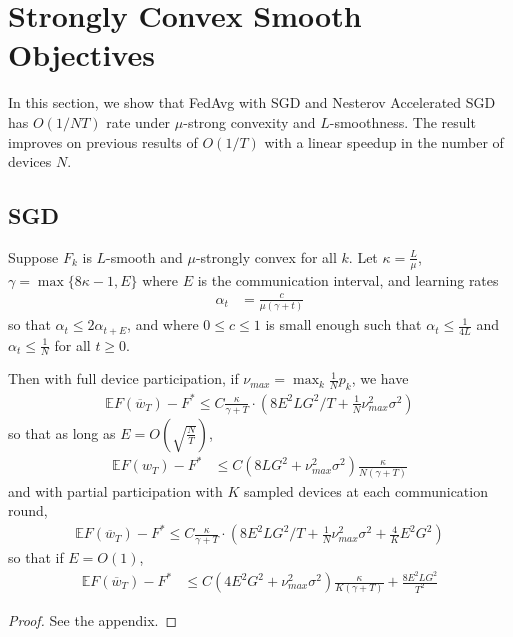 


\section{Strongly Convex Smooth Objectives}

In this section, we show that FedAvg with SGD and Nesterov Accelerated SGD has $O(1/NT)$ rate under $\mu$-strong
convexity and $L$-smoothness. The result improves on previous results of
$O(1/T)$ with a linear speedup in the number of devices $N$.

\subsection{SGD}

\begin{theorem}
	Suppose $F_{k}$ is $L$-smooth and $\mu$-strongly convex for all
	$k$. Let $\kappa=\frac{L}{\mu}$, $\gamma=\max\{8\kappa-1,E\}$ where
	$E$ is the communication interval, and learning rates 
	\begin{align*}
	\alpha_{t} & =\frac{c}{\mu(\gamma+t)}
	\end{align*}
	so that $\alpha_{t}\leq2\alpha_{t+E}$, and where $0\leq c\leq1$
	is small enough such that
	$\alpha_{t} \leq\frac{1}{4L}$ and 
	$\alpha_{t} \leq\frac{1}{N}$ for all $t\geq0$. 
	
	Then with full device participation, if $\nu_{max}=\max_{k}\frac{1}{N}p_{k}$,
	we have 
	\begin{align*}
	\mathbb{E}F(\overline{w}_{T})-F^{\ast}\leq C\frac{\kappa}{\gamma+T}\cdot(8E^{2}LG^{2}/T+\frac{1}{N}\nu_{max}^{2}\sigma^{2})
	\end{align*}
	so that as long as $E=O(\sqrt{\frac{N}{T}})$, 
	\begin{align*}
	\mathbb{E}F(w_{T})-F^{\ast} & \leq C(8LG^{2}+\nu_{max}^{2}\sigma^{2})\frac{\kappa}{N(\gamma+T)}
	\end{align*}
	and with partial participation with $K$ sampled devices at each
	communication round, 
	\begin{align*}
	\mathbb{E}F(\overline{w}_{T})-F^{\ast}\leq C\frac{\kappa}{\gamma+T}\cdot(8E^{2}LG^{2}/T+\frac{1}{N}\nu_{max}^{2}\sigma^{2}+\frac{4}{K}E^{2}G^{2})
	\end{align*}
	so that if $E=O(1)$, 
	\begin{align*}
	\mathbb{E}F(\overline{w}_{T})-F^{\ast} & \leq C(4E^{2}G^{2}+\nu_{max}^{2}\sigma^{2})\frac{\kappa}{K(\gamma+T)}+\frac{8E^{2}LG^{2}}{T^{2}}
	\end{align*}
	\label{th:strongcvxsmth}
\end{theorem}
\begin{proof}
	See the appendix.
\end{proof}


